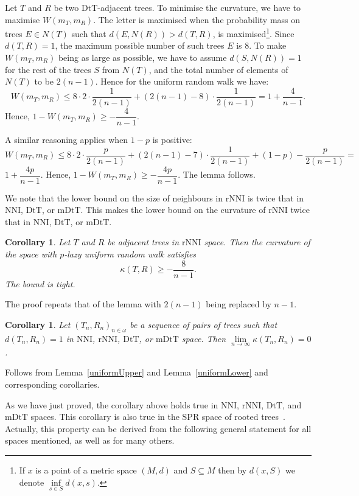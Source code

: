 \documentclass{amsart}
\newtheorem{corollary}[lemma]{Corollary}
\newcommand{\dts}{\mathrm{DtT}}
\newcommand{\nni}{\mathrm{NNI}}
\newcommand{\rnni}{\mathrm{rNNI}}
\newcommand{\mdts}{\mathrm{mDtT}}
\begin{document}
\proof
Let $T$ and $R$ be two $\dts$-adjacent trees. To minimise the curvature, we have
to maximise $W(m_T, m_R)$. The letter is maximised when the probability mass
on trees $E\in N(T)$ such that $d(E, N(R)) > d(T, R)$, is
maximised\footnote{If $x$ is a point of a metric space $(M,d)$ and
$S \subseteq M$ then by $d(x,S)$ we denote $\inf\limits_{s \in S} d(x,s)$.}.
Since $d(T, R) = 1$, the maximum possible number of such trees $E$ is
$8$. To make $W(m_T,m_R)$ being as large as possible, we have to assume
$d(S, N(R)) = 1$ for the rest of the trees $S$ from $N(T)$, and the
total number of elements of $N(T)$ to be $2(n-1)$.
Hence for the uniform random walk we have:
\[
W(m_T,m_R)\leq 8 \cdot 2 \cdot \frac{1}{2(n - 1)} +
(2(n - 1) - 8) \cdot \frac{1}{2(n-1)} = 1 + \dfrac{4}{n-1}.
\]
Hence, $1 - W(m_T,m_R) \geq - \dfrac{4}{n-1}$.

A similar reasoning applies when $1-p$ is positive:
\[
W(m_T,m_R)\leq 8 \cdot 2 \cdot \frac{p}{2(n - 1)} +
(2(n - 1) - 7) \cdot \frac{1}{2(n-1)} + (1-p) - \frac{p}{2(n-1)} =
\]
$1 + \dfrac{4p}{n-1}$. Hence,
$1 - W(m_T,m_R) \geq - \dfrac{4p}{n-1}$. The lemma follows.
\endproof

We note that the lower bound on the size of neighbours in $\rnni$ is twice that in $\nni$, $\dts$, or $\mdts$.
This makes the lower bound on the curvature of $\rnni$ twice that in $\nni$, $\dts$, or $\mdts$.

\begin{corollary}
Let $T$ and $R$ be adjacent trees in $\rnni$ space.
Then the curvature of the space with $p$-lazy uniform random walk satisfies
\[
\kappa(T,R) \geq -\frac{8}{n-1}.
\]
The bound is tight.
\end{corollary}

\proof
The proof repeats that of the lemma with $2(n-1)$ being replaced by $n-1$.
\endproof

\begin{corollary}\label{flatInLimDTS}
Let $(T_n,R_n)_{n\in\omega}$ be a sequence of pairs of trees such that
$d(T_n,R_n) = 1$ in $\nni$, $\rnni$, $\dts$, or $\mdts$ space.
Then $\lim\limits_{n \to \infty}\kappa(T_n,R_n) = 0$.
\end{corollary}

\proof
Follows from Lemma~\ref{uniformUpper} and Lemma~\ref{uniformLower} and corresponding corollaries.
\endproof

As we have just proved, the corollary above holds true in $\nni$, $\rnni$, $\dts$, and $\mdts$ spaces.
This corollary is also true in the SPR space of rooted trees~\cite{Whidden2015-es}.
Actually, this property can be derived from the following general statement for all spaces mentioned, as well as for many others.
\end{document}
